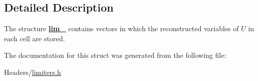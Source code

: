 \subsection{Detailed Description}
The structure {\bfseries \hyperlink{structlim__}{lim\+\_\+}} contains vectors in which the reconstructed variables of $U$ in each cell are stored. 

The documentation for this struct was generated from the following file\+:\begin{DoxyCompactItemize}
\item 
Headers/\hyperlink{limiters_8h}{limiters.\+h}\end{DoxyCompactItemize}
